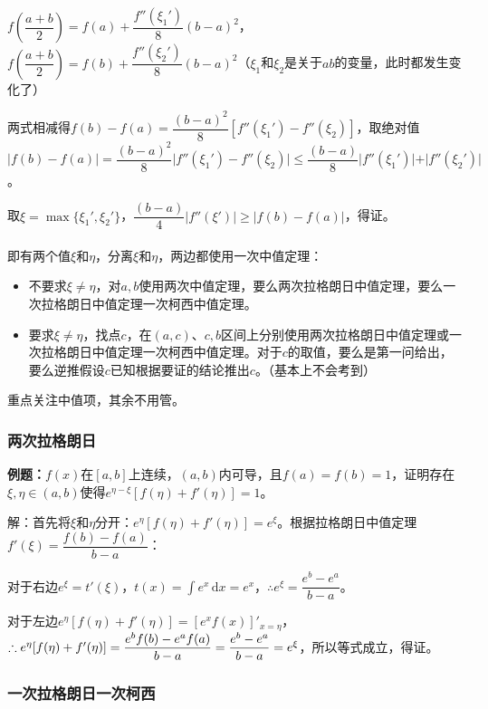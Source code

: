 $f\left(\dfrac{a+b}{2}\right)=f(a)+\dfrac{f''(\xi_1')}{8}(b-a)^2$，$f\left(\dfrac{a+b}{2}\right)=f(b)+\dfrac{f''(\xi_2')}{8}(b-a)^2$（$\xi_1$和$\xi_2$是关于$ab$的变量，此时都发生变化了）

两式相减得$f(b)-f(a)=\dfrac{(b-a)^2}{8}[f''(\xi_1')-f''(\xi_2)]$，取绝对值$\vert f(b)-f(a)\vert=\dfrac{(b-a)^2}{8}\vert f''(\xi_1')-f''(\xi_2)\vert\leqslant\dfrac{(b-a)}{8}\vert f''(\xi_1')\vert+\vert f''(\xi_2')\vert$。

取$\xi=\max\{\xi_1',\xi_2'\}$，$\dfrac{(b-a)}{4}\vert f''(\xi')\vert\geqslant\vert f(b)-f(a)\vert$，得证。

\paragraph{}

即有两个值$\xi$和$\eta$，分离$\xi$和$\eta$，两边都使用一次中值定理：

\begin{itemize}
    \item 不要求$\xi\neq\eta$，对$a,b$使用两次中值定理，要么两次拉格朗日中值定理，要么一次拉格朗日中值定理一次柯西中值定理。
    \item 要求$\xi\neq\eta$，找点$c$，在$(a,c)$、$c,b$区间上分别使用两次拉格朗日中值定理或一次拉格朗日中值定理一次柯西中值定理。对于$c$的取值，要么是第一问给出，要么逆推假设$c$已知根据要证的结论推出$c$。（基本上不会考到）
\end{itemize}

重点关注中值项，其余不用管。

\subsubsection{两次拉格朗日}

\textbf{例题：}$f(x)$在$[a,b]$上连续，$(a,b)$内可导，且$f(a)=f(b)=1$，证明存在$\xi,\eta\in(a,b)$使得$e^{\eta-\xi}[f(\eta)+f'(\eta)]=1$。

解：首先将$\xi$和$\eta$分开：$e^\eta[f(\eta)+f'(\eta)]=e^\xi$。根据拉格朗日中值定理$f'(\xi)=\dfrac{f(b)-f(a)}{b-a}$：

对于右边$e^\xi=t'(\xi)$，$t(x)=\int e^x\,\textrm{d}x=e^x$，$\therefore e^\xi=\dfrac{e^b-e^a}{b-a}$。

对于左边$e^\eta[f(\eta)+f'(\eta)]=[e^xf(x)]'_{x=\eta}$，$\therefore e^\eta[f(\eta)+f'(\eta)]=\dfrac{e^bf(b)-e^af(a)}{b-a}\\=\dfrac{e^b-e^a}{b-a}=e^\xi$，所以等式成立，得证。

\subsubsection{一次拉格朗日一次柯西}

